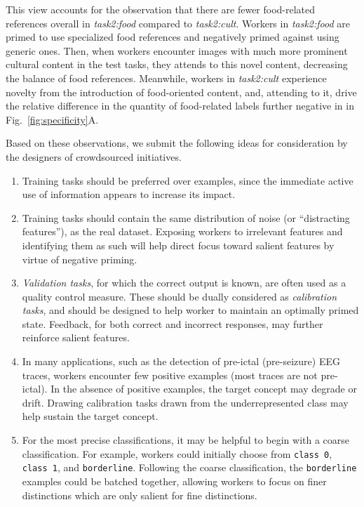 \documentclass[12pt]{article}
\begin{document}
This view accounts for the observation that there are fewer
food-related references overall in \textit{task2:food} compared to 
\textit{task2:cult}.  Workers in \textit{task2:food} are primed to use
specialized food references and negatively primed against using generic
ones.  Then, when workers encounter images with much more prominent 
cultural content in the test tasks, they attends to this novel content, 
decreasing the balance of food references.  
Meanwhile, workers in 
\textit{task2:cult} experience novelty from the introduction of food-oriented 
content, and, attending to it, drive the relative difference in the quantity 
of food-related labels further negative in in Fig.~\ref{fig:specificity}A.

Based on these observations, we submit the following ideas for consideration 
by the designers of crowdsourced initiatives.
\begin{enumerate}
	\item{
		Training tasks should be preferred over examples, since the immediate
		active use of information appears to increase its impact.
	}
	\item{
		Training tasks should contain the same distribution of 
		noise (or ``distracting features''), as the real dataset.
		Exposing workers to irrelevant features and identifying them as such
		will help direct focus toward salient features by virtue of
		negative priming.
	}
	\item{
		\textit{Validation tasks}, for which the correct output is known,
		are often used as a quality control measure.
		These should be dually considered as \textit{calibration tasks}, and
		should be designed to help worker to maintain an optimally primed 
		state. Feedback, for both correct and incorrect responses, 
		may further reinforce salient features.
	}
	\item{
		In many applications, such as the detection of pre-ictal 
		(pre-seizure) EEG traces, workers encounter few positive examples
		(most traces are not pre-ictal).  In the absence of positive examples,
		the target concept may degrade or drift.
		Drawing calibration tasks drawn from the underrepresented class may 
		help sustain the target concept.
	}
	\item{
		For the most precise classifications, it may be helpful to
		begin with a coarse classification.  For example, workers could 
		initially choose from  \texttt{class 0}, \texttt{class 1}, and 
		\texttt{borderline}.  Following the coarse classification, the 
		\texttt{borderline} examples could be batched together, allowing 
		workers to focus on finer distinctions which are only salient for fine 
		distinctions.
	}
\end{enumerate}
\end{document}
